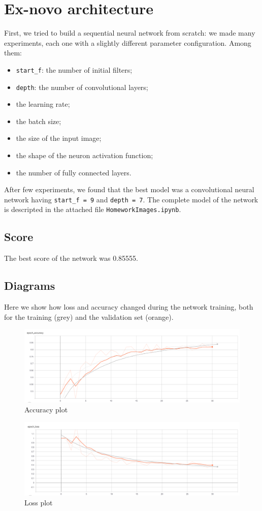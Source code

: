 \documentclass[12pt,a4paper]{report}
\begin{document}
		\section{Ex-novo architecture}
	First, we tried to build a sequential neural network from scratch: we made many experiments, each one with a slightly different parameter configuration. Among them:
			\begin{itemize}
				\item \texttt{start\_f}: the number of initial filters;
				\item \texttt{depth}: the number of convolutional layers;
				\item the learning rate;
				\item the batch size;
				\item the size of the input image;
				\item the shape of the neuron activation function;	
				\item the number of fully connected layers.
			\end{itemize}
	After few experiments, we found that the best model was a convolutional neural network having \texttt{start\_f = 9} and \texttt{depth = 7}. The complete model of the network is descripted in the attached file \texttt{HomeworkImages.ipynb}.
		\subsection{Score}
	The best score of the network was 0.85555.
		\subsection{Diagrams}
Here we show how loss and accuracy changed during the network training, both for the training (grey) and the validation set (orange).
		\begin{figure}[H]
			\includegraphics[scale = 0.5, center]{ex-Novo accuracy}
			\caption{Accuracy plot}
		\end{figure}
		\begin{figure}[H]
		\includegraphics[scale = 0.5, center]{ex-Novo loss}
		\caption{Loss plot}
		\end{figure}
\end{document}
